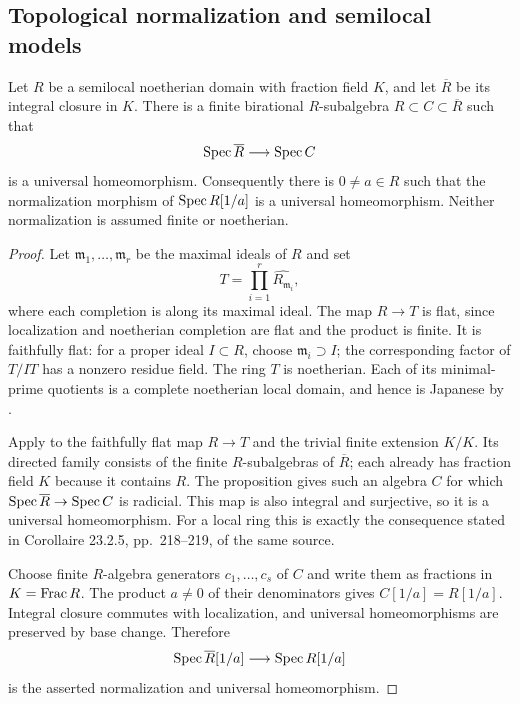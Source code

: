 \subsection{Topological normalization and semilocal models}

\begin{lemma}
\label{A:semilocal-topnormalization}
Let $R$ be a semilocal noetherian domain with fraction field $K$,
and let $\overline R$ be its integral closure in $K$.
There is a finite birational $R$-subalgebra
$R\subset C\subset\overline R$ such that
\[
 \operatorname{Spec}\overline R\longrightarrow\operatorname{Spec} C
\]
is a universal homeomorphism. Consequently there is $0\neq a\in R$
such that the normalization morphism of $\operatorname{Spec} R[1/a]$ is a
universal homeomorphism. Neither normalization is assumed finite
or noetherian.
\end{lemma}
\begin{proof}
Let $\mathfrak m_1,\ldots,\mathfrak m_r$ be the maximal ideals of
$R$ and set
\[
 T=\prod_{i=1}^r\widehat{R_{\mathfrak m_i}},
\]
where each completion is along its maximal ideal. The map $R\to T$
is flat, since localization and noetherian completion are flat and
the product is finite. It is faithfully flat: for a proper ideal
$I\subset R$, choose $\mathfrak m_i\supset I$; the corresponding
factor of $T/IT$ has a nonzero residue field. The ring $T$ is
noetherian. Each of its minimal-prime quotients is a complete
noetherian local domain, and hence is Japanese by
\citet[Chapitre 0, Th\'eor\`eme 23.1.5, pp.~215--216]{A_EGAIV1}.

Apply \citet[Chapitre 0, Proposition 23.2.4(ii), p.~218]{A_EGAIV1}
to the faithfully flat map $R\to T$ and the trivial finite
extension $K/K$. Its directed family consists of the finite
$R$-subalgebras of $\overline R$; each already has fraction field
$K$ because it contains $R$. The proposition gives such an
algebra $C$ for which $\operatorname{Spec}\overline R\to\operatorname{Spec} C$ is radicial.
This map is also integral and surjective, so it is a universal
homeomorphism. For a local ring this is exactly the consequence
stated in Corollaire 23.2.5, pp.~218--219, of the same source.

Choose finite $R$-algebra generators $c_1,\ldots,c_s$ of $C$ and
write them as fractions in $K=\operatorname{Frac} R$. The product $a\neq0$ of
their denominators gives $C[1/a]=R[1/a]$. Integral closure
commutes with localization, and universal homeomorphisms are
preserved by base change. Therefore
\[
 \operatorname{Spec}\overline R[1/a]\longrightarrow\operatorname{Spec} R[1/a]
\]
is the asserted normalization and universal homeomorphism.
\end{proof}


